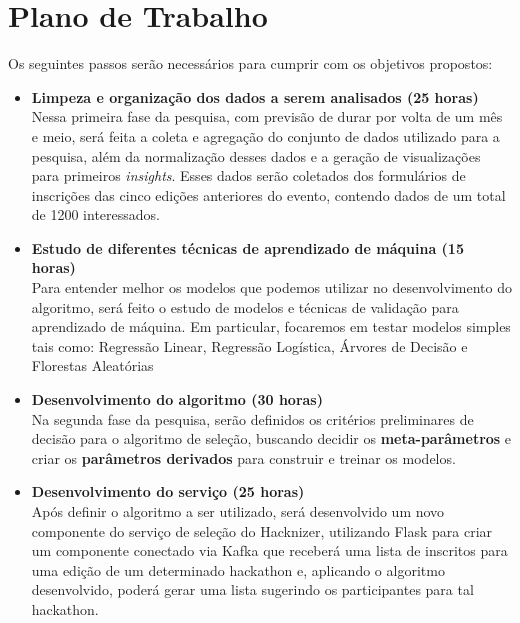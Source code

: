 \documentclass[10pt,twoside,a4paper]{article}
\begin{document}
\section{Plano de Trabalho}
  
  Os seguintes passos serão necessários para cumprir com os objetivos propostos:

  \begin{itemize}
    \item \textbf{Limpeza e organização dos dados a serem analisados (25 horas)} \\
        Nessa primeira fase da pesquisa, com previsão de durar por volta de um mês e meio, será feita a coleta e agregação do conjunto de dados utilizado para a pesquisa, além da normalização desses dados e a geração de visualizações para primeiros \textit{insights}. Esses dados serão coletados dos formulários de inscrições das cinco edições anteriores do evento, contendo dados de um total de 1200 interessados.
    
    \item \textbf{Estudo de diferentes técnicas de aprendizado de máquina (15 horas)} \\
        Para entender melhor os modelos que podemos utilizar no desenvolvimento do algoritmo, será feito o estudo de modelos e técnicas de validação para aprendizado de máquina. Em particular, focaremos em testar modelos simples tais como: Regressão Linear, Regressão Logística, Árvores de Decisão e Florestas Aleatórias 
    
    \item \textbf{Desenvolvimento do algoritmo (30 horas)} \\
        Na segunda fase da pesquisa, serão definidos os critérios preliminares de decisão para o algoritmo de seleção, buscando decidir os \textbf{meta-parâmetros} e criar os \textbf{parâmetros derivados} para construir e treinar os modelos.
          
    \item \textbf{Desenvolvimento do serviço (25 horas)} \\
        Após definir o algoritmo a ser utilizado, será desenvolvido um novo componente do serviço de seleção do Hacknizer, utilizando Flask para criar um componente conectado via Kafka que receberá uma lista de inscritos para uma edição de um determinado hackathon e, aplicando o algoritmo desenvolvido, poderá gerar uma lista sugerindo os participantes para tal hackathon. 
    

\end{itemize}
\end{document}
